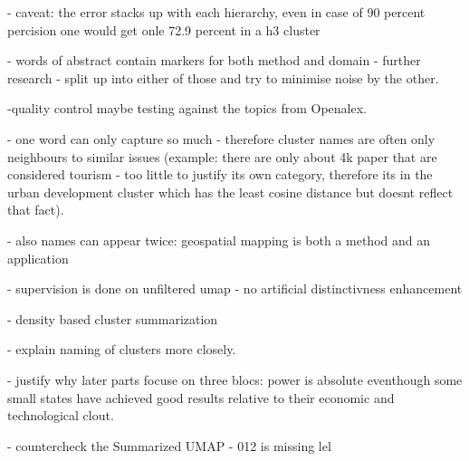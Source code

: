 \documentclass{article}
\begin{document}
- caveat: the error stacks up with each hierarchy, even in case of 90 percent percision one would get onle 72.9 percent in a h3 cluster

- words of abstract contain markers for both method and domain - further research - split up into either of those and try to minimise noise by the other.

-quality control maybe testing against the topics from Openalex.

- one word can only capture so much - therefore cluster names are often only neighbours to similar issues (example: there are only about 4k paper that are considered tourism - too little to justify its own category, therefore its in the urban development cluster which has the least cosine distance but doesnt reflect that fact). 

- also names can appear twice: geospatial mapping is both a method and an application

- supervision is done on unfiltered umap - no artificial distinctivness enhancement

- density based cluster summarization 

- explain naming of clusters more closely.

- justify why later parts focuse on three blocs: power is absolute eventhough some small states have achieved good results relative to their economic and technological clout. 

- countercheck the Summarized UMAP - 012 is missing lel

\printbibliography[title={REFERENCES}]
\end{document}
